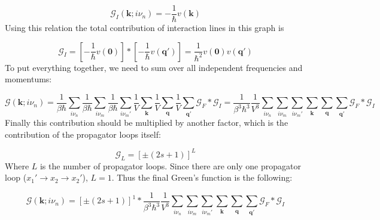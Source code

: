 \begin{equation} \label{eq:55}
\mathcal{G}_{I} \left( \boldsymbol{k}; i \nu_{n} \right)
=
- \frac{1}{\hbar} v \left( \boldsymbol{k} \right)
\end{equation}
Using this relation the total contribution of interaction lines in this graph is

\begin{equation} \label{eq:56}
\mathcal{G}_{I}
=
\left[ - \frac{1}{\hbar} v \left( \boldsymbol{0} \right) \right]
*
\left[ - \frac{1}{\hbar} v \left( \boldsymbol{q}' \right) \right]
=
\frac{1}{\hbar^{2}} v \left( \boldsymbol{0} \right) v \left( \boldsymbol{q}' \right)
\end{equation}
To put everything together, we need to sum over all independent frequencies and momentums:

\begin{equation} \label{eq:57}
\mathcal{G} \left( \boldsymbol{k}; i \nu_{n} \right)
=
\frac{1}{\beta \hbar} \sum_{i \nu_{n}}
\frac{1}{\beta \hbar} \sum_{i \nu_{m}}
\frac{1}{\beta \hbar} \sum_{i \nu_{m}'}
\frac{1}{V} \sum_{\boldsymbol{k}}
\frac{1}{V} \sum_{\boldsymbol{q}}
\frac{1}{V} \sum_{\boldsymbol{q}'}
\mathcal{G}_{F} * \mathcal{G}_{I}
=
\frac{1}{\beta^{3} \hbar^{3}} \frac{1}{V^{3}}
\sum_{i \nu_{n}}
\sum_{i \nu_{m}}
\sum_{i \nu_{m}'}
\sum_{\boldsymbol{k}}
\sum_{\boldsymbol{q}}
\sum_{\boldsymbol{q}'}
\mathcal{G}_{F} * \mathcal{G}_{I}
\end{equation}
Finally this contribution should be multiplied by another factor, which is the contribution of the propagator loops itself:

\begin{equation} \label{eq:58}
\mathcal{G}_{L}
=
\left[ \pm \left( 2s + 1 \right) \right]^{L}
\end{equation}
Where $L$ is the number of propagator loops. Since there are only one propagator loop ($x_{1}' \to x_{2} \to x_{2}'$), $L = 1$. Thus the final Green's function is the following:

\begin{equation} \label{eq:59}
\mathcal{G} \left( \boldsymbol{k}; i \nu_{n} \right)
=
\left[ \pm \left( 2s + 1 \right) \right]^{1} *
\frac{1}{\beta^{3} \hbar^{3}} \frac{1}{V^{3}}
\sum_{i \nu_{n}}
\sum_{i \nu_{m}}
\sum_{i \nu_{m}'}
\sum_{\boldsymbol{k}}
\sum_{\boldsymbol{q}}
\sum_{\boldsymbol{q}'}
\mathcal{G}_{F} * \mathcal{G}_{I}
\end{equation}